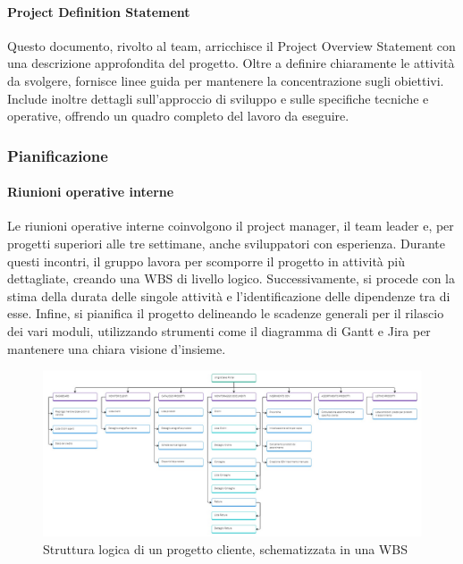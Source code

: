             \paragraph{Project Definition Statement}
            Questo documento, rivolto al team, arricchisce il Project Overview Statement con una descrizione approfondita
            del progetto. Oltre a definire chiaramente le attività da svolgere, fornisce linee guida per mantenere la concentrazione
            sugli obiettivi. Include inoltre dettagli sull’approccio di sviluppo e sulle specifiche tecniche e operative, offrendo
            un quadro completo del lavoro da eseguire.

        \subsubsection{Pianificazione}
            \paragraph{Riunioni operative interne}
            Le riunioni operative interne coinvolgono il project manager, il team leader e, per progetti superiori alle tre
            settimane, anche sviluppatori con esperienza. Durante questi incontri, il gruppo lavora per scomporre il
            progetto in attività più dettagliate, creando una \ac{WBS} di livello logico. Successivamente,
            si procede con la stima della durata delle singole attività e l’identificazione delle dipendenze tra di esse.
            Infine, si pianifica il progetto delineando le scadenze generali per il
            rilascio dei vari moduli, utilizzando strumenti come il diagramma di Gantt e Jira per mantenere una chiara visione d’insieme.
            
            \begin{figure}
                \centering
                \includegraphics[width=\linewidth]{figures/ProgettoClienteWBS.jpg}
                \caption{Struttura logica di un progetto cliente, schematizzata in una WBS}
                \label{fig:wbs-nuovo}
            \end{figure}
